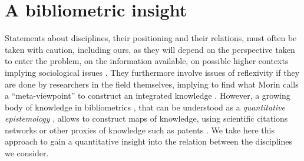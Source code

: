 \documentclass[alpha-refs]{wiley-article}
\begin{document}
\section{A bibliometric insight}


Statements about disciplines, their positioning and their relations, must often be taken with caution, including ours, as they will depend on the perspective taken to enter the problem, on the information available, on possible higher contexts implying sociological issues \cite{latour1977rhetorique}. They furthermore involve issues of reflexivity if they are done by researchers in the field themselves, implying to find what Morin calls a ``meta-viewpoint'' to construct an integrated knowledge \cite{edgar1986methode}. However, a growing body of knowledge in bibliometrics \cite{waltman2010unified}, that can be understood as a \emph{quantitative epistemology} \cite{chavalarias2013phylomemetic}, allows to construct maps of knowledge, using scientific citations networks or other proxies of knowledge such as patents \cite{bergeaud2017classifying}. We take here this approach to gain a quantitative insight into the relation between the disciplines we consider.

\end{document}

